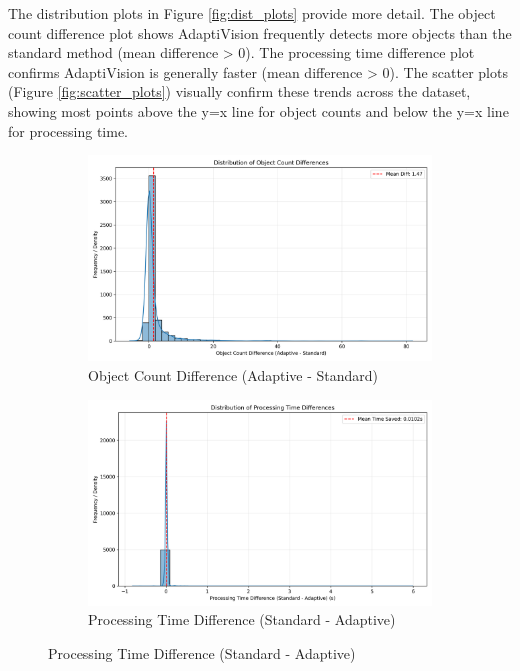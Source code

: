 \documentclass{article}
\begin{document}
The distribution plots in Figure \ref{fig:dist_plots} provide more detail. The object count difference plot shows AdaptiVision frequently detects more objects than the standard method (mean difference > 0). The processing time difference plot confirms AdaptiVision is generally faster (mean difference > 0). The scatter plots (Figure \ref{fig:scatter_plots}) visually confirm these trends across the dataset, showing most points above the y=x line for object counts and below the y=x line for processing time.

\begin{figure}[p] %
    \centering
    \begin{subfigure}[b]{0.48\textwidth}
        \includegraphics[width=\linewidth]{figures/object_count_difference_distribution.png}
        \caption{Object Count Difference (Adaptive - Standard)}
        \label{fig:count_diff_dist}
    \end{subfigure}
    \hfill %
    \begin{subfigure}[b]{0.48\textwidth}
        \includegraphics[width=\linewidth]{figures/processing_time_difference_distribution.png}
        \caption{Processing Time Difference (Standard - Adaptive)}
        \label{fig:time_diff_dist}
    \end{subfigure}
    

\end{figure}
\end{document}
